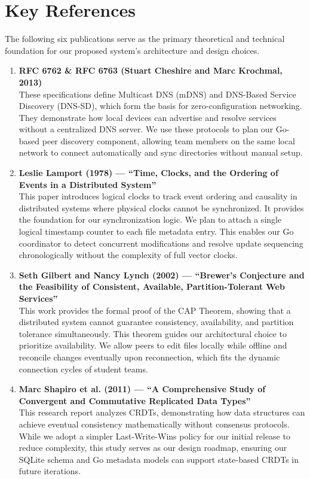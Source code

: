 \documentclass[11pt,oneside]{article}
\begin{document}
\section{Key References}

The following six publications serve as the primary theoretical and technical foundation for our proposed system's architecture and design choices.

\begin{enumerate}
    \item \textbf{RFC 6762 \& RFC 6763 (Stuart Cheshire and Marc Krochmal, 2013)} \cite{rfc6762, rfc6763} \\
    These specifications define Multicast DNS (mDNS) and DNS-Based Service Discovery (DNS-SD), which form the basis for zero-configuration networking. They demonstrate how local devices can advertise and resolve services without a centralized DNS server. We use these protocols to plan our Go-based peer discovery component, allowing team members on the same local network to connect automatically and sync directories without manual setup.

    \item \textbf{Leslie Lamport (1978) --- ``Time, Clocks, and the Ordering of Events in a Distributed System''} \cite{lamport1978} \\
    This paper introduces logical clocks to track event ordering and causality in distributed systems where physical clocks cannot be synchronized. It provides the foundation for our synchronization logic. We plan to attach a single logical timestamp counter to each file metadata entry. This enables our Go coordinator to detect concurrent modifications and resolve update sequencing chronologically without the complexity of full vector clocks.

    \item \textbf{Seth Gilbert and Nancy Lynch (2002) --- ``Brewer's Conjecture and the Feasibility of Consistent, Available, Partition-Tolerant Web Services''} \cite{brewer2002} \\
    This work provides the formal proof of the CAP Theorem, showing that a distributed system cannot guarantee consistency, availability, and partition tolerance simultaneously. This theorem guides our architectural choice to prioritize availability. We allow peers to edit files locally while offline and reconcile changes eventually upon reconnection, which fits the dynamic connection cycles of student teams.

    \item \textbf{Marc Shapiro et al. (2011) --- ``A Comprehensive Study of Convergent and Commutative Replicated Data Types''} \cite{shapiro2011} \\
    This research report analyzes CRDTs, demonstrating how data structures can achieve eventual consistency mathematically without consensus protocols. While we adopt a simpler Last-Write-Wins policy for our initial release to reduce complexity, this study serves as our design roadmap, ensuring our SQLite schema and Go metadata models can support state-based CRDTs in future iterations.


\end{enumerate}
\end{document}
